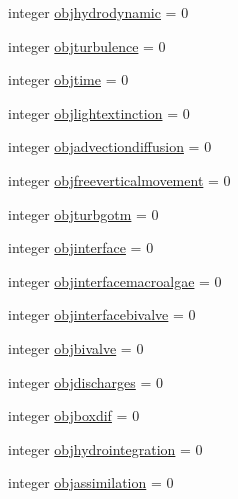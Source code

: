 \begin{DoxyCompactItemize}
\item 
integer \mbox{\hyperlink{structmodulewaterproperties_1_1t__waterproperties_ad7a608c3e4deb3fbdb0a9f5b915ed0ae}{objhydrodynamic}} = 0
\item 
integer \mbox{\hyperlink{structmodulewaterproperties_1_1t__waterproperties_a6a782489211956c1ab4587a2aa080e11}{objturbulence}} = 0
\item 
integer \mbox{\hyperlink{structmodulewaterproperties_1_1t__waterproperties_a11be0162c4fbba7f5eeb9a3f05891c6a}{objtime}} = 0
\item 
integer \mbox{\hyperlink{structmodulewaterproperties_1_1t__waterproperties_ae946e923d15be3cf094c8357ebefc093}{objlightextinction}} = 0
\item 
integer \mbox{\hyperlink{structmodulewaterproperties_1_1t__waterproperties_a33a29008fc0149fffe4bbc9a88bf61f5}{objadvectiondiffusion}} = 0
\item 
integer \mbox{\hyperlink{structmodulewaterproperties_1_1t__waterproperties_a1275644660f5e471e3a54045651b147a}{objfreeverticalmovement}} = 0
\item 
integer \mbox{\hyperlink{structmodulewaterproperties_1_1t__waterproperties_a82befa9a7df4c764ef11595cea063712}{objturbgotm}} = 0
\item 
integer \mbox{\hyperlink{structmodulewaterproperties_1_1t__waterproperties_a318338dcd17f0796b53c509fd68f967d}{objinterface}} = 0
\item 
integer \mbox{\hyperlink{structmodulewaterproperties_1_1t__waterproperties_a6112d0d4ac916cce1dcf9e02ebd9fd18}{objinterfacemacroalgae}} = 0
\item 
integer \mbox{\hyperlink{structmodulewaterproperties_1_1t__waterproperties_a534d523f3de0db4b0f044905f26b7cf3}{objinterfacebivalve}} = 0
\item 
integer \mbox{\hyperlink{structmodulewaterproperties_1_1t__waterproperties_ad52d5702259d0c2501585d70b485e58e}{objbivalve}} = 0
\item 
integer \mbox{\hyperlink{structmodulewaterproperties_1_1t__waterproperties_a9ad746cf30d29f78327fc7523c42d96a}{objdischarges}} = 0
\item 
integer \mbox{\hyperlink{structmodulewaterproperties_1_1t__waterproperties_a0f6e7099c906437504baac0ce5bbb6e8}{objboxdif}} = 0
\item 
integer \mbox{\hyperlink{structmodulewaterproperties_1_1t__waterproperties_a555db2d23bab5fbd69a1df82c86343a4}{objhydrointegration}} = 0
\item 
integer \mbox{\hyperlink{structmodulewaterproperties_1_1t__waterproperties_a7d506429c8c523fda679db889840cb79}{objassimilation}} = 0

\end{DoxyCompactItemize}
